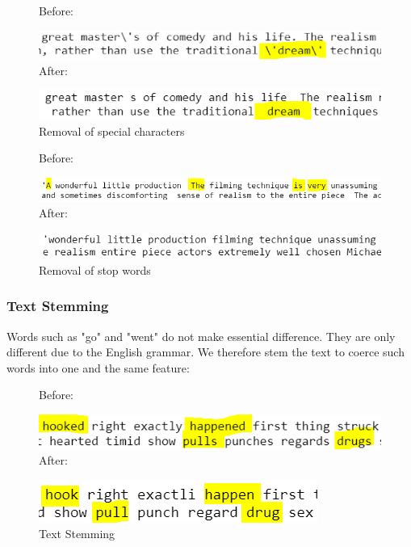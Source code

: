 \documentclass[10pt,twocolumn,letterpage]{article}
\begin{document}
	\begin{figure}[H]
		\textsf{Before:}
		
		\includegraphics[width = \columnwidth]{special_char}
		\textsf{After:}
		
		\includegraphics[width = \columnwidth]{special_char_removed}
		\caption{Removal of special characters}
	\end{figure}
	
	\begin{figure}[H]
		\textsf{Before:}
		
		\includegraphics[width = \columnwidth]{stop_words}
		\textsf{After:}
		
		\includegraphics[width = \columnwidth]{stop_words_removed}
		\caption{Removal of stop words}
	\end{figure}
	\subsubsection{Text Stemming}
	Words such as "go" and "went" do not make essential difference. They are only different due to the English grammar. We therefore stem the text to coerce such words into one and the same feature:
	\begin{figure}[H]
		\textsf{Before:}
		
		\includegraphics[width = \columnwidth]{stem}
		\textsf{After:}
		
		\includegraphics[width = \columnwidth]{after_stem}
		\caption{Text Stemming}
	\end{figure}
	
\end{document}
